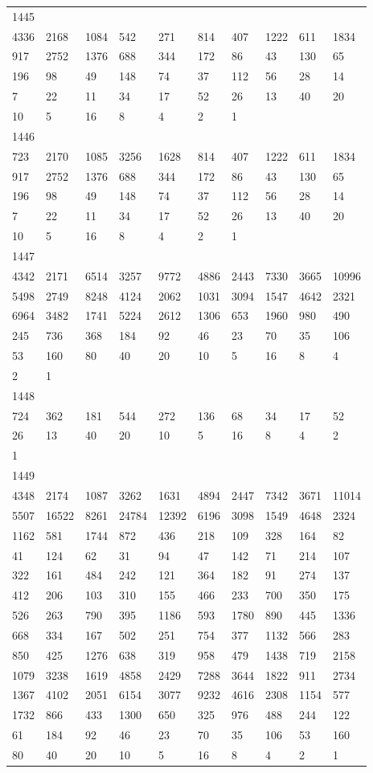 \begin{longtable}{*{10}{l}}
1445&&&&&&&&&\\
4336& 2168& 1084& 542& 271& 814& 407& 1222& 611& 1834\\
917& 2752& 1376& 688& 344& 172& 86& 43& 130& 65\\
196& 98& 49& 148& 74& 37& 112& 56& 28& 14\\
7& 22& 11& 34& 17& 52& 26& 13& 40& 20\\
10& 5& 16& 8& 4& 2& 1& \\

1446&&&&&&&&&\\
723& 2170& 1085& 3256& 1628& 814& 407& 1222& 611& 1834\\
917& 2752& 1376& 688& 344& 172& 86& 43& 130& 65\\
196& 98& 49& 148& 74& 37& 112& 56& 28& 14\\
7& 22& 11& 34& 17& 52& 26& 13& 40& 20\\
10& 5& 16& 8& 4& 2& 1& \\

1447&&&&&&&&&\\
4342& 2171& 6514& 3257& 9772& 4886& 2443& 7330& 3665& 10996\\
5498& 2749& 8248& 4124& 2062& 1031& 3094& 1547& 4642& 2321\\
6964& 3482& 1741& 5224& 2612& 1306& 653& 1960& 980& 490\\
245& 736& 368& 184& 92& 46& 23& 70& 35& 106\\
53& 160& 80& 40& 20& 10& 5& 16& 8& 4\\
2& 1& \\

1448&&&&&&&&&\\
724& 362& 181& 544& 272& 136& 68& 34& 17& 52\\
26& 13& 40& 20& 10& 5& 16& 8& 4& 2\\
1& \\

1449&&&&&&&&&\\
4348& 2174& 1087& 3262& 1631& 4894& 2447& 7342& 3671& 11014\\
5507& 16522& 8261& 24784& 12392& 6196& 3098& 1549& 4648& 2324\\
1162& 581& 1744& 872& 436& 218& 109& 328& 164& 82\\
41& 124& 62& 31& 94& 47& 142& 71& 214& 107\\
322& 161& 484& 242& 121& 364& 182& 91& 274& 137\\
412& 206& 103& 310& 155& 466& 233& 700& 350& 175\\
526& 263& 790& 395& 1186& 593& 1780& 890& 445& 1336\\
668& 334& 167& 502& 251& 754& 377& 1132& 566& 283\\
850& 425& 1276& 638& 319& 958& 479& 1438& 719& 2158\\
1079& 3238& 1619& 4858& 2429& 7288& 3644& 1822& 911& 2734\\
1367& 4102& 2051& 6154& 3077& 9232& 4616& 2308& 1154& 577\\
1732& 866& 433& 1300& 650& 325& 976& 488& 244& 122\\
61& 184& 92& 46& 23& 70& 35& 106& 53& 160\\
80& 40& 20& 10& 5& 16& 8& 4& 2& 1\\


\end{longtable}
